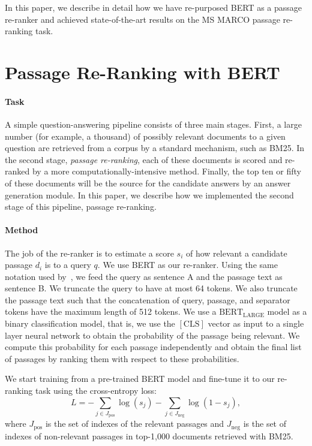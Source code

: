 \documentclass{article} %
\begin{document}
In this paper, we describe in detail how we have re-purposed BERT as a passage re-ranker and achieved state-of-the-art results on the MS MARCO passage re-ranking task.

\section{Passage Re-Ranking with BERT}

\paragraph{Task}

A simple question-answering pipeline consists of three main stages. First, a large number (for example, a thousand) of possibly relevant documents to a given question are retrieved from a corpus by a standard mechanism, such as BM25. In the second stage, \textit{passage re-ranking}, each of these documents is scored and re-ranked by a more computationally-intensive method. Finally, the top ten or fifty of these documents will be the source for the candidate answers by an answer generation module. 
In this paper, we describe how we implemented the second stage of this pipeline, passage re-ranking.

\paragraph{Method}

The job of the re-ranker is to estimate a score $s_i$ of how relevant a candidate passage $d_i$ is to a query $q$.
We use BERT as our re-ranker. Using the same notation used by~\citet{devlin2018bert}, we feed the query as sentence A and the passage text as sentence B. We truncate the query to have at most 64 tokens. We also truncate the passage text such that the concatenation of query, passage, and separator tokens have the maximum length of 512 tokens. We use a $\text{BERT}_\text{LARGE}$ model as a binary classification model, that is, we use the $[\text{CLS}]$ vector as input to a single layer neural network to obtain the probability of the passage being relevant. We compute this probability for each passage independently and obtain the final list of passages by ranking them with respect to these probabilities. 

We start training from a pre-trained BERT model and fine-tune it to our re-ranking task using the cross-entropy loss: 
\begin{equation} 
\label{eq:aggregator_loss}
L = -\sum_{j \in J_{\text{pos}}} \log (s_j) - \sum_{j \in J_{\text{neg}}} \log (1 - s_j),
\end{equation}
where $J_{\text{pos}}$ is the set of indexes of the relevant passages and $J_{\text{neg}}$ is the set of indexes of non-relevant passages in top-1,000 documents retrieved with BM25. 
\end{document}
